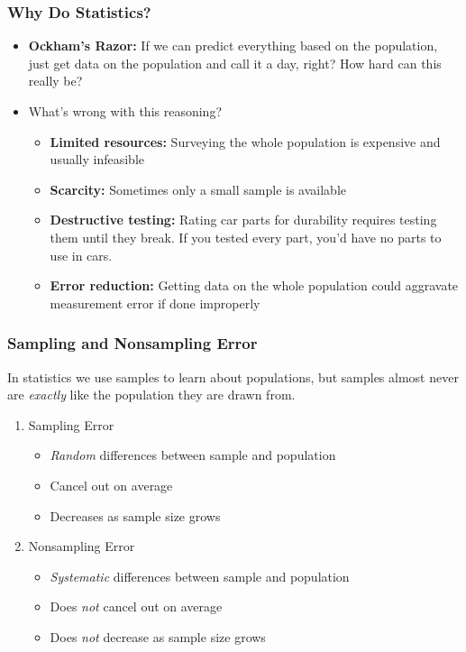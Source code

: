 \documentclass{beamer}
\begin{document}
\begin{frame}
\frametitle{Why Do Statistics?}
	\begin{itemize}[<+- | alert@+>]
		\item \textbf{Ockham's Razor:} If we can predict everything based on the population, just 			get data on the population and call it a day, right? How hard can this really be?
		\item What's wrong with this reasoning?
		\begin{itemize}[<+- | alert@+>]
			\item \textbf{Limited resources:} Surveying the whole population is expensive and 					usually infeasible
			\item \textbf{Scarcity:} Sometimes only a small sample is available
			\item \textbf{Destructive testing:} Rating car parts for durability requires testing them 				until they break. If you tested every part, you'd have no parts to use in cars.
			\item \textbf{Error reduction:} Getting data on the whole population could aggravate 				measurement error if done improperly
		\end{itemize}
	\end{itemize}	
\end{frame}

\begin{frame}
\frametitle{Sampling and Nonsampling Error}
In statistics we use samples to learn about populations, but samples almost never are \emph{exactly} like the population they are drawn from.
	\begin{enumerate}
		\item Sampling Error 
			\begin{itemize}
				\item \emph{Random} differences between sample and population
				\item Cancel out on average
				\item Decreases as sample size grows
			\end{itemize}
		\item Nonsampling Error
			\begin{itemize}
				\item \emph{Systematic} differences between sample and population 
				\item Does \emph{not} cancel out on average
				\item Does \emph{not} decrease as sample size grows
			\end{itemize}
	\end{enumerate}
\end{frame}
\end{document}
